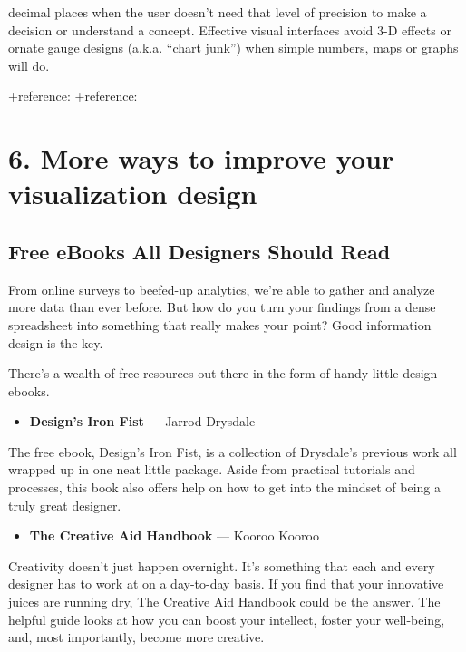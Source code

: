 \documentclass[]{book}
\providecommand{\tightlist}{%
  \setlength{\itemsep}{0pt}\setlength{\parskip}{0pt}}
\theoremstyle{definition}
\theoremstyle{definition}
\theoremstyle{definition}
\theoremstyle{remark}
\begin{document}
decimal places when the user doesn't need that level of precision to
make a decision or understand a concept. Effective visual interfaces
avoid 3-D effects or ornate gauge designs (a.k.a. ``chart junk'') when
simple numbers, maps or graphs will do.

+reference: \citep{French} +reference: \citep{Steier}

\section{6. More ways to improve your visualization
design}\label{more-ways-to-improve-your-visualization-design}

\subsection{Free eBooks All Designers Should
Read}\label{free-ebooks-all-designers-should-read}

From online surveys to beefed-up analytics, we're able to gather and
analyze more data than ever before. But how do you turn your findings
from a dense spreadsheet into something that really makes your point?
Good information design is the key.

There's a wealth of free resources out there in the form of handy little
design ebooks.

\begin{itemize}
\tightlist
\item
  \textbf{Design's Iron Fist} --- Jarrod Drysdale
\end{itemize}

The free ebook, Design's Iron Fist, is a collection of Drysdale's
previous work all wrapped up in one neat little package. Aside from
practical tutorials and processes, this book also offers help on how to
get into the mindset of being a truly great designer.

\begin{itemize}
\tightlist
\item
  \textbf{The Creative Aid Handbook} --- Kooroo Kooroo
\end{itemize}

Creativity doesn't just happen overnight. It's something that each and
every designer has to work at on a day-to-day basis. If you find that
your innovative juices are running dry, The Creative Aid Handbook could
be the answer. The helpful guide looks at how you can boost your
intellect, foster your well-being, and, most importantly, become more
creative.
\end{document}
